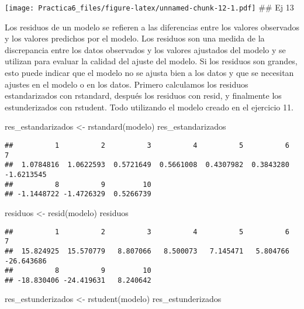 \documentclass[
]{article}
\newenvironment{Shaded}{\begin{snugshade}}{\end{snugshade}}
\newcommand{\FunctionTok}[1]{\textcolor[rgb]{0.00,0.00,0.00}{#1}}
\newcommand{\NormalTok}[1]{#1}
\newcommand{\OtherTok}[1]{\textcolor[rgb]{0.56,0.35,0.01}{#1}}
\begin{document}
\texttt{[image: Practica6\_files/figure-latex/unnamed-chunk-12-1.pdf]}
\#\# Ej 13

Los residuos de un modelo se refieren a las diferencias entre los
valores observados y los valores predichos por el modelo. Los residuos
son una medida de la discrepancia entre los datos observados y los
valores ajustados del modelo y se utilizan para evaluar la calidad del
ajuste del modelo. Si los residuos son grandes, esto puede indicar que
el modelo no se ajusta bien a los datos y que se necesitan ajustes en el
modelo o en los datos. Primero calculamos los residuos estandarizados
con rstandard, después los residuos con resid, y finalmente los
estunderizados con rstudent. Todo utilizando el modelo creado en el
ejercicio 11.

\begin{Shaded}
\begin{Highlighting}[]
\NormalTok{res\_estandarizados }\OtherTok{\textless{}{-}} \FunctionTok{rstandard}\NormalTok{(modelo)}
\NormalTok{res\_estandarizados}
\end{Highlighting}
\end{Shaded}

\begin{verbatim}
##          1          2          3          4          5          6          7 
##  1.0784816  1.0622593  0.5721649  0.5661008  0.4307982  0.3843280 -1.6213545 
##          8          9         10 
## -1.1448722 -1.4726329  0.5266739
\end{verbatim}

\begin{Shaded}
\begin{Highlighting}[]
\NormalTok{residuos }\OtherTok{\textless{}{-}} \FunctionTok{resid}\NormalTok{(modelo)}
\NormalTok{residuos}
\end{Highlighting}
\end{Shaded}

\begin{verbatim}
##          1          2          3          4          5          6          7 
##  15.824925  15.570779   8.807066   8.500073   7.145471   5.804766 -26.643686 
##          8          9         10 
## -18.830406 -24.419631   8.240642
\end{verbatim}

\begin{Shaded}
\begin{Highlighting}[]
\NormalTok{res\_estunderizados }\OtherTok{\textless{}{-}} \FunctionTok{rstudent}\NormalTok{(modelo)}
\NormalTok{res\_estunderizados}
\end{Highlighting}
\end{Shaded}
\end{document}
